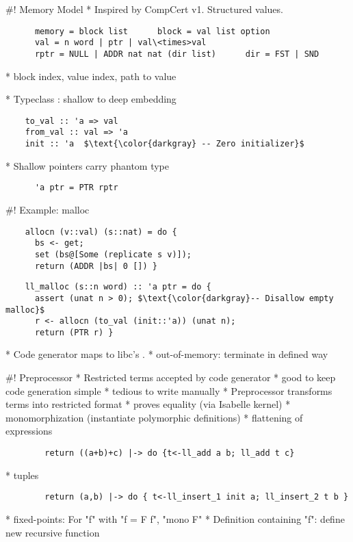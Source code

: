\documentclass[fleqn]{beamer}
\begin{document}
#! Memory Model
  * Inspired by CompCert v1. Structured values.

    \begin{lstlisting}
      memory = block list      block = val list option
      val = n word | ptr | val\<times>val
      rptr = NULL | ADDR nat nat (dir list)      dir = FST | SND
    \end{lstlisting}

    *  block index, value index, path to value

  \pause

  * Typeclass : shallow to deep embedding
    \begin{lstlisting}
    to_val :: 'a => val
    from_val :: val => 'a
    init :: 'a  $\text{\color{darkgray} -- Zero initializer}$
    \end{lstlisting}

  \pause

  * Shallow pointers carry phantom type
    \begin{lstlisting}
      'a ptr = PTR rptr
    \end{lstlisting}


#! Example: malloc
  \begin{lstlisting}
    allocn (v::val) (s::nat) = do {
      bs <- get;
      set (bs@[Some (replicate s v)]);
      return (ADDR |bs| 0 []) }
  \end{lstlisting}
  \pause

  \begin{lstlisting}
    ll_malloc (s::n word) :: 'a ptr = do {
      assert (unat n > 0); $\text{\color{darkgray}-- Disallow empty malloc}$
      r <- allocn (to_val (init::'a)) (unat n);
      return (PTR r) }
  \end{lstlisting}
  \pause

  * Code generator maps  to libc's .
    * out-of-memory: terminate in defined way 

\renewcommand{\insertsectitle}{\color{blue}{Basic Layer}}

#! Preprocessor
  * Restricted terms accepted by code generator
    * good to keep code generation simple
    * tedious to write manually
  \pause
  * Preprocessor transforms terms into restricted format
      \pause
    * proves equality (via Isabelle kernel)
      \pause
    * monomorphization (instantiate polymorphic definitions)
      \pause
    * flattening of expressions
      \begin{lstlisting}
        return ((a+b)+c) |-> do {t<-ll_add a b; ll_add t c}
      \end{lstlisting}
      \pause
    * tuples
      \begin{lstlisting}
        return (a,b) |-> do { t<-ll_insert_1 init a; ll_insert_2 t b }
      \end{lstlisting}
      \pause
    * fixed-points: For \is"f" with \is"f = F f", \is"mono F"
      * Definition containing \is"f": define new recursive function
\end{document}
